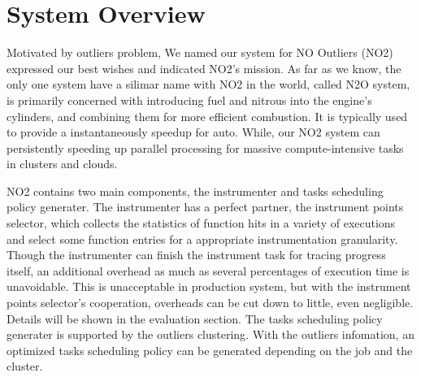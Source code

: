 \section{System Overview}

Motivated by outliers problem, We named our system for NO Outliers (NO2) expressed our best wishes and indicated NO2's mission. As far as we know, the only one system have a silimar name with NO2 in the world, called N2O system, is primarily concerned with introducing fuel and nitrous into the engine's cylinders, and combining them for more efficient combustion. It is typically used to provide a instantaneously speedup for auto. While, our NO2 system can persistently speeding up parallel processing for massive compute-intensive tasks in clusters and clouds.

NO2 contains two main components, the instrumenter and tasks scheduling policy generater. The instrumenter has a perfect partner, the instrument points selector, which collects the statistics of function hits in a variety of executions and select some function entries for a appropriate instrumentation granularity. Though the instrumenter can finish the instrument task for tracing progress itself, an additional overhead as much as several percentages of execution time is unavoidable. This is unacceptable in production system, but with the instrument points selector's cooperation, overheads can be cut down to little, even negligible. Details will be shown in the evaluation section. The tasks scheduling policy generater is supported by the outliers clustering. With the outliers infomation, an optimized tasks scheduling policy can be generated depending on the job and the cluster.

